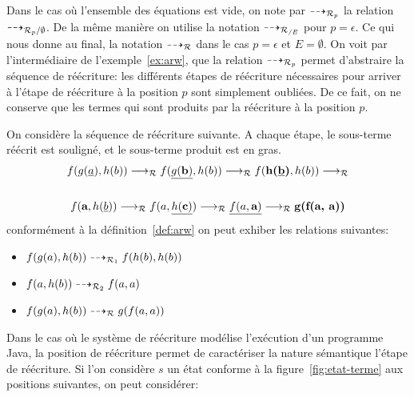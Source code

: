 Dans le cas où l'ensemble des équations est vide, on note par $\dashrightarrow_{\mathcal R_p}$ la relation $\dashrightarrow_{\mathcal R_p/\emptyset}$.
De la même manière on utilise la notation $\dashrightarrow_{\mathcal R_{/E}}$ pour $p = \epsilon$. Ce qui nous donne au final, la notation
$\dashrightarrow_\mathcal R$ dans le cas $p = \epsilon$ et $E = \emptyset$.
On voit par l'intermédiaire de l'exemple~\ref{ex:arw}, que la relation $\dashrightarrow_{\mathcal R_p}$ permet 
d'abstraire la séquence de réécriture: les différents étapes de réécriture nécessaires
pour arriver à l'étape de réécriture à la position $p$ sont simplement oubliées.
De ce fait, on ne conserve que les termes qui sont produits par la réécriture à la position $p$.
\begin{example}
  \label{ex:arw}
  On considère la séquence de réécriture suivante. A chaque étape, le
  sous-terme réécrit est souligné, et le sous-terme produit est en
  gras.
  \begin{multline*}
    f(g(\underline{a}), h(b)) \lrw_\R 
    f(\underline{g(\textbf{b})}, h(b)) \lrw_\R 
    f(\textbf{h(\underline{b})}, h(b)) \lrw_\R
    \\
    \\
    f(\textbf{a}, h(\underline{b})) \lrw_\R 
    f(a, \underline{h(\textbf{c})}) \lrw_\R 
    \underline{f(a, \textbf{a})} \lrw_\R 
    \textbf{g(f(a, a))} %
  \end{multline*}
  conformément à la définition~\ref{def:arw} on peut exhiber les relations suivantes:
  
  \medskip
  \begin{itemize}
  \item $f(g(a), h(b)) \dashrightarrow_{\mathcal R_1} f(h(b), h(b))$
  \item $f(a, h(b)) \dashrightarrow_{\mathcal R_2} f(a, a)$
  \item $f(g(a), h(b)) \dashrightarrow_\mathcal R g(f(a,a))$
  \end{itemize}
\end{example}

Dans le cas où le système de réécriture modélise l'exécution d'un programme Java, la position de réécriture
permet de caractériser la nature sémantique l'étape de réécriture.
Si l'on considère $s$ un état conforme à la figure~\ref{fig:etat-terme} aux positions suivantes, on peut considérer:

